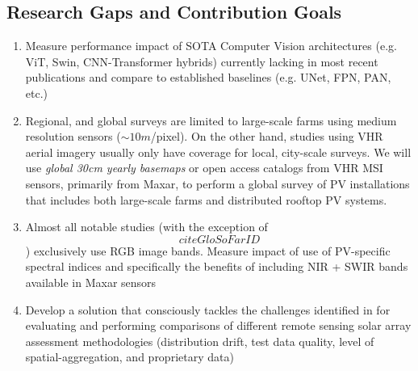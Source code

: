     
\subsection{Research Gaps and Contribution Goals}
    \begin{enumerate}
        \item Measure performance impact of SOTA Computer Vision architectures (e.g. ViT, Swin, CNN-Transformer hybrids) currently lacking in most recent publications and compare to established baselines (e.g. UNet, FPN, PAN, etc.)
        \item Regional, and global surveys are limited to large-scale farms using medium resolution sensors ($\sim10m$/pixel). On the other hand, studies using VHR aerial imagery usually only have coverage for local, city-scale surveys.
        We will use \textit{global 30cm yearly basemaps} or open access catalogs from VHR MSI sensors, primarily from Maxar, to perform a global survey of PV installations that includes both large-scale farms and distributed rooftop PV systems.
        \item Almost all notable studies (with the exception of \[cite GloSoFarID\]) exclusively use RGB image bands. Measure impact of use of PV-specific spectral indices\cite{He_universal_pv_spectral_index_2024} and specifically the benefits of including NIR + SWIR bands available in Maxar sensors
        \item Develop a solution that consciously tackles the challenges identified in \cite{Hu_solar_array_pitfalls_2022} for evaluating and performing comparisons of different remote sensing solar array assessment methodologies
        (distribution drift, test data quality, level of spatial-aggregation, and proprietary data)
    \end{enumerate}
    \hfill
